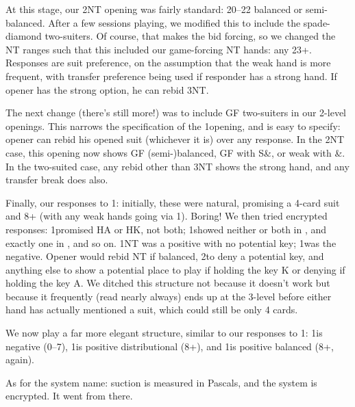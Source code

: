\documentclass[a4paper,14pt]{extarticle}
\begin{document}
At this stage, our 2NT opening was fairly standard: 20--22 balanced or
semi-balanced.  After a few sessions playing, we modified this to include the
spade-diamond two-suiters.  Of course, that makes the bid forcing, so we
changed the NT ranges such that this included our game-forcing NT hands: any
23+.  Responses are suit preference, on the assumption that the weak hand is
more frequent, with transfer preference being used if responder has a strong
hand.  If opener has the strong option, he can rebid 3NT.

The next change (there's still more!) was to include GF two-suiters in our
2-level openings.  This narrows the specification of the 1\clubs opening, and is
easy to specify: opener can rebid his opened suit (whichever it is) over any
response.  In the 2NT case, this opening now shows GF (semi-)balanced, GF with
S\&\diamonds, or weak with \spades\&\diamonds.  In the two-suited case, any rebid other than 3NT shows
the strong hand, and any transfer break does also.

Finally, our responses to 1\clubs: initially, these were natural, promising a 4-card
suit and 8+ (with any weak hands going via 1\diamonds).  Boring!  We then tried
encrypted responses: 1\hearts promised HA or HK, not both; 1\spades showed neither or both
in \hearts, and exactly one in \spades, and so on.  1NT was a positive with no potential
key; 1\diamonds was the negative.  Opener would rebid NT if balanced, 2\hearts to deny a
potential key, and anything else to show a potential place to play if holding
the key K or denying if holding the key A.  We ditched this structure not
because it doesn't work but because it frequently (read nearly always) ends up
at the 3-level before either hand has actually mentioned a suit, which could
still be only 4 cards.

We now play a far more elegant structure, similar to our responses to 1\diamonds: 1\diamonds is
negative (0--7), 1\hearts is positive distributional (8+), and 1\spades is positive balanced
(8+, again).

As for the system name: suction is measured in Pascals, and the system is
encrypted.  It went from there.

\newevenside

\def\thesection{\Alph{section}}
\setcounter{section}{0}

\small

\end{document}
